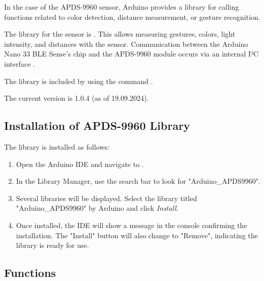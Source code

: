 In the case of the APDS-9960 sensor, Arduino provides a library  for calling functions related to color detection, distance measurement, or gesture recognition.

The library for the sensor is . This allows measuring gestures, colors, light intensity, and distances with the sensor. Communication between the Arduino Nano 33 BLE Sense's chip and the APDS-9960 module occurs via an internal I²C interface \cite{Avago:2015}.

The library is included by using the command .

The current version is 1.0.4 (as of 19.09.2024).




\subsection{Installation of APDS-9960 Library}

The library is installed as follows:


\begin{enumerate}
	\item Open the Arduino IDE and navigate to .
	\item In the Library Manager, use the search bar to look for "Arduino\_APDS9960".
	\item Several libraries will be displayed. Select the library titled "Arduino\_APDS9960" by Arduino and click \textit{Install}.
	\item Once installed, the IDE will show a message in the console confirming the installation. The "Install" button will also change to "Remove", indicating the library is ready for use.
\end{enumerate}

\subsection{Functions}

